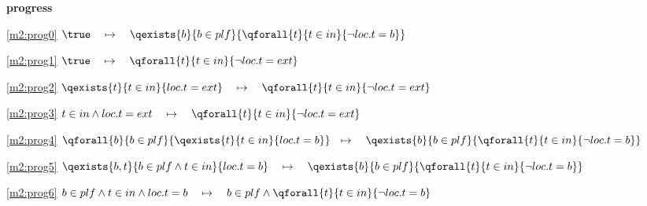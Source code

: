 \textbf{progress}
\begin{block}
\item[ \eqref{m2:prog0} ]$\true \quad \mapsto\quad \qexists{b}{b \in plf}{ \qforall{t}{t \in in}{ \neg loc.t = b}} $ %
\item[ \eqref{m2:prog1} ]$\true \quad \mapsto\quad \qforall{t}{t \in in}{ \neg loc.t = ext} $ %
\item[ \eqref{m2:prog2} ]$\qexists{t}{t \in in}{ loc.t = ext}  \quad \mapsto\quad \qforall{t}{t \in in}{ \neg loc.t = ext} $ %
\item[ \eqref{m2:prog3} ]$t \in in \land loc.t = ext  \quad \mapsto\quad \qforall{t}{t \in in}{ \neg loc.t = ext} $ %
\item[ \eqref{m2:prog4} ]$\qforall{b}{b \in plf}{ \qexists{t}{t \in in}{ loc.t = b}} \!\! \quad \mapsto\quad \qexists{b}{b \in plf}{ \qforall{t}{t \in in}{ \neg loc.t = b}} $ %
\item[ \eqref{m2:prog5} ]$\qexists{b,t}{b \in plf \land t \in in}{ loc.t = b} \quad \mapsto\quad \qexists{b}{b \in plf}{ \qforall{t}{t \in in}{ \neg loc.t = b}} $ %
\item[ \eqref{m2:prog6} ]$b \in plf \land t \in in \land loc.t = b  \quad \mapsto\quad b \in plf \land \qforall{t}{t \in in}{ \neg loc.t = b} $ %
\end{block}
